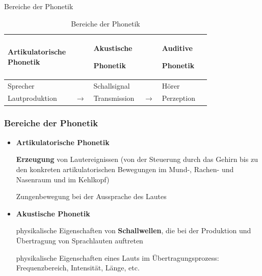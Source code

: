 \begin{frame}{Bereiche der Phonetik}

	\begin{table}
	\centering 
	
		\begin{tabular}{p{0.23\linewidth}p{0.05\linewidth}p{0.23\linewidth}p{0.05\linewidth}p{0.23\linewidth}}
			\hline
			\textbf{Artikulatorische Phonetik} & & \textbf{Akustische}\par \textbf{Phonetik} & & \textbf{Auditive}\par \textbf{Phonetik} \\
			\hline
  			Sprecher & & Schallsignal & & Hörer \\
			\hline
			Lautproduktion & $\rightarrow$ & Transmission & $\rightarrow$ & Perzeption\\
			\hline
		\end{tabular}
		
	\caption{Bereiche der Phonetik \citep{Ramers08a}} 
	\end{table}	
		
\end{frame}


\begin{frame}
\frametitle{Bereiche der Phonetik}

	\begin{itemize}
		\item \textbf{Artikulatorische Phonetik}
		
\textbf{Erzeugung} von Lautereignissen (von der Steuerung durch das Gehirn bis zu den konkreten artikulatorischen Bewegungen im Mund-, Rachen- und Nasenraum und im Kehlkopf)

			\ea Zungenbewegung bei der Aussprache des Lautes \textipa{[ \texttoptiebar{tS} ]}
			\z

\pause 
		
		\item \textbf{Akustische Phonetik}
		
                       physikalische Eigenschaften von \textbf{Schallwellen}, die bei der Produktion und Übertragung von Sprachlauten auftreten

			\ea physikalische Eigenschaften eines Lauts im Übertragungsprozess: Frequenzbereich, Intensität, Länge, etc.
			\z

	\end{itemize}

\end{frame}


